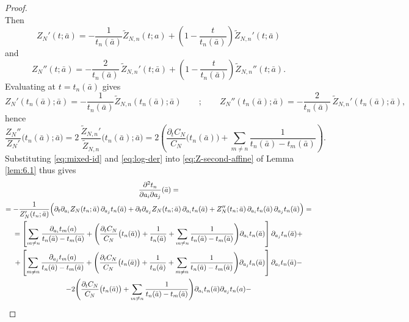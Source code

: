 \documentclass[12pt,reqno]{amsart}
\theoremstyle{plain}
\theoremstyle{definition}
\theoremstyle{remark}
\begin{document}
\begin{proof}
\begin{equation}
\end{equation} 
Then
\begin{equation}
Z_N'(t; \bar a)=-\frac{1}{t_n(\bar a)} \widetilde{Z}_{N,n}(t;a)+\left (1-\frac{t}{t_n(\bar a)} \right ) \widetilde{Z}_{N,n}'(t;\bar a)
\end{equation} 
and 
\begin{equation}
Z_N''(t;\bar a)=-\frac{2}{t_n(\bar a)} \,\widetilde{Z}_{N,n}'(t; \bar a)+\left (1-\frac{t}{t_n(\bar a)} \right ) \widetilde{Z}_{N,n}''(t;\bar a).
\end{equation}
Evaluating at \(t=t_n(\bar a)\) gives
\begin{equation}
Z_N'(t_n( \bar a) ;\bar a)=-\frac{1}{t_n(\bar a)} \widetilde{Z}_{N,n}(t_n (\bar a) ;\bar a) \qquad ; \qquad Z_N''(t_n ( \bar a) ;\bar a)=-\frac{2}{t_n(\bar a)}\,\widetilde{Z}_{N,n}'(t_n(\bar a) ; \bar a),
\end{equation}
hence
\begin{equation}\label{eq:log-der}
\frac{Z_N''}{Z_N'}\bigl(t_n(\bar a);\bar a\bigr)
=2\,\frac{\widetilde{Z}_{N,n}'}{\widetilde{Z}_{N,n}}\bigl(t_n(\bar a);\bar a\bigr)
=2\left(\frac{\partial_t C_N}{C_N}\bigl(t_n(\bar a)\bigr)+\sum_{m\neq n}\frac{1}{t_n(\bar a)-t_m(\bar a)}\right).
\end{equation}
Substituting \eqref{eq:mixed-id} and \eqref{eq:log-der} into \eqref{eq:Z-second-affine} of Lemma \ref{lem:6.1} thus gives \begin{multline}\label{eq:Z-second-affine-2} \frac{\partial^2 t_n}{\partial a_i\partial a_j}(\bar a) =\\= -\frac{1}{Z_N'(t_n;\bar a)} \Bigl( \partial_t\partial_{a_i}Z_N(t_n;\bar a)\,\partial_{a_j}t_n(\bar a) +\partial_t\partial_{a_j}Z_N(t_n;\bar a)\,\partial_{a_i}t_n(\bar a) +Z_N''(t_n;\bar a)\,\partial_{a_i}t_n(\bar a)\,\partial_{a_j}t_n(\bar a) \Bigr)= \\ = \left [ \sum_{m\neq n}\frac{\partial_{a_i}t_m(a)}{t_n(\bar a)-t_m(\bar a)} + \Biggl(\frac{\partial_t C_N}{C_N}\bigl(t_n(\bar a)\bigr)+\frac{1}{t_n(\bar a)}+\sum_{m\neq n}\frac{1}{t_n(\bar a)-t_m(\bar a)}\Biggr)\partial_{a_i}t_n(\bar a) \right ] \partial_{a_j} t_n(\bar a) +\\+ \left [ \sum_{m\neq n}\frac{\partial_{a_j}t_m(a)}{t_n(\bar a)-t_m(\bar a)} + \Biggl(\frac{\partial_t C_N}{C_N}\bigl(t_n(\bar a)\bigr)+\frac{1}{t_n(\bar a)}+\sum_{m\neq n}\frac{1}{t_n(\bar a)-t_m(\bar a)}\Biggr)\partial_{a_j}t_n(\bar a) \right ] \partial_{a_i} t_n(\bar a) - \\- 2 \Biggl(\frac{\partial_t C_N}{C_N}\bigl(t_n(\bar a)\bigr)+\sum_{m\neq n}\frac{1}{t_n(\bar a)-t_m(\bar a)}\Biggr)\partial_{a_i}t_n(\bar a)\partial_{a_j}t_n(a)-\\

\end{multline}
\end{proof}
\end{document}

